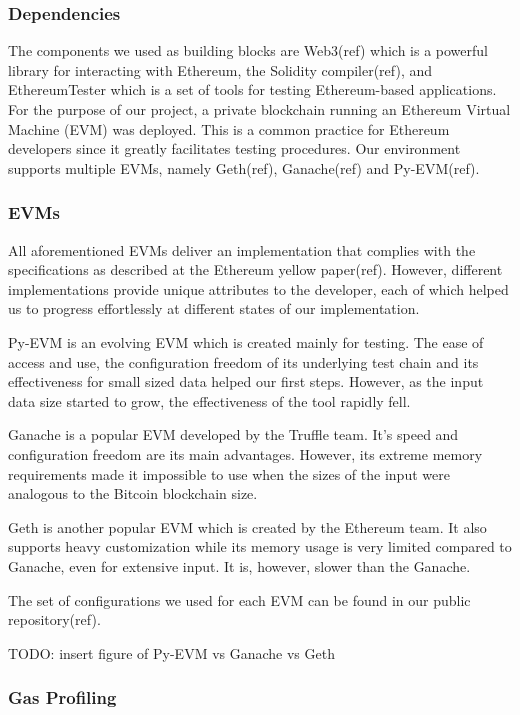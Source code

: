 \documentclass{article}
\begin{document}
  \subsubsection{Dependencies}

  The components we used as building blocks are Web3(ref) which is a
  powerful library for interacting with Ethereum, the Solidity
  compiler(ref), and EthereumTester which is a set of tools for testing
  Ethereum-based applications. For the purpose of our project, a private
  blockchain running an Ethereum Virtual Machine (EVM) was deployed.
  This is a common practice for Ethereum developers since it greatly
  facilitates testing procedures. Our environment supports multiple
  EVMs, namely Geth(ref), Ganache(ref) and Py-EVM(ref).

  \subsubsection{EVMs}

  All aforementioned EVMs deliver an implementation that complies with
  the specifications as described at the Ethereum yellow paper(ref).
  However, different implementations provide unique attributes to the
  developer, each of which helped us to progress effortlessly at
  different states of our implementation.

  Py-EVM is an evolving EVM which is created mainly for testing. The
  ease of access and use, the configuration freedom of its underlying
  test chain and its effectiveness for small sized data helped our first
  steps. However, as the input data size started to grow, the
  effectiveness of the tool rapidly fell.

  Ganache is a popular EVM developed by the Truffle team. It’s speed and
  configuration freedom are its main advantages. However, its extreme
  memory requirements made it impossible to use when the sizes of the
  input were analogous to the Bitcoin blockchain size.

  Geth is another popular EVM which is created by the Ethereum team. It
  also supports heavy customization while its memory usage is very
  limited compared to Ganache, even for extensive input. It is, however,
  slower than the Ganache.

  The set of configurations we used for each EVM can be found in our
  public repository(ref).

  TODO: insert figure of Py-EVM vs Ganache vs Geth

  \subsubsection{Gas Profiling}
\end{document}
